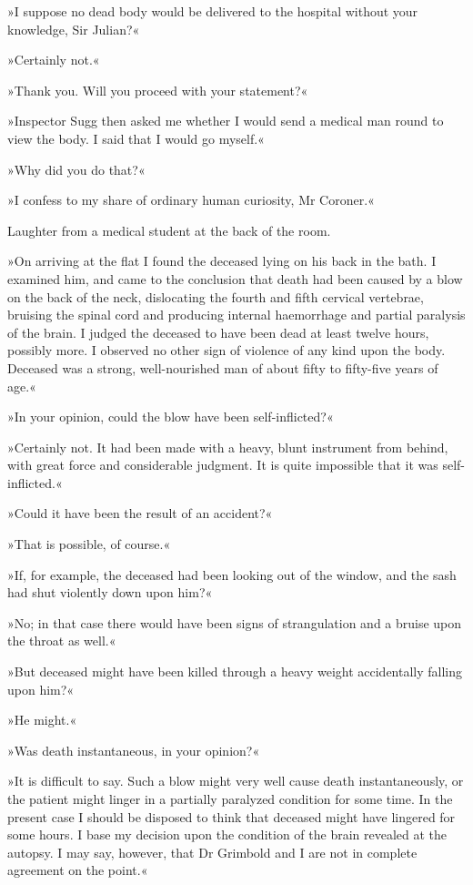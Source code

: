»I suppose no dead body would be delivered to the hospital without your knowledge, Sir Julian?«

»Certainly not.«

»Thank you. Will you proceed with your statement?«

»Inspector Sugg then asked me whether I would send a medical man round to view the body. I said that I would go myself.«

»Why did you do that?«

»I confess to my share of ordinary human curiosity, Mr Coroner.«

Laughter from a medical student at the back of the room.

»On arriving at the flat I found the deceased lying on his back in the bath. I examined him, and came to the conclusion that death had been caused by a blow on the back of the neck, dislocating the fourth and fifth cervical vertebrae, bruising the spinal cord and producing internal haemorrhage and partial paralysis of the brain. I judged the deceased to have been dead at least twelve hours, possibly more. I observed no other sign of violence of any kind upon the body. Deceased was a strong, well-nourished man of about fifty to fifty-five years of age.«

»In your opinion, could the blow have been self-inflicted?«

»Certainly not. It had been made with a heavy, blunt instrument from behind, with great force and considerable judgment. It is quite impossible that it was self-inflicted.«

»Could it have been the result of an accident?«

»That is possible, of course.«

»If, for example, the deceased had been looking out of the window, and the sash had shut violently down upon him?«

»No; in that case there would have been signs of strangulation and a bruise upon the throat as well.«

»But deceased might have been killed through a heavy weight accidentally falling upon him?«

»He might.«

»Was death instantaneous, in your opinion?«

»It is difficult to say. Such a blow might very well cause death instantaneously, or the patient might linger in a partially paralyzed condition for some time. In the present case I should be disposed to think that deceased might have lingered for some hours. I base my decision upon the condition of the brain revealed at the autopsy. I may say, however, that Dr Grimbold and I are not in complete agreement on the point.«

